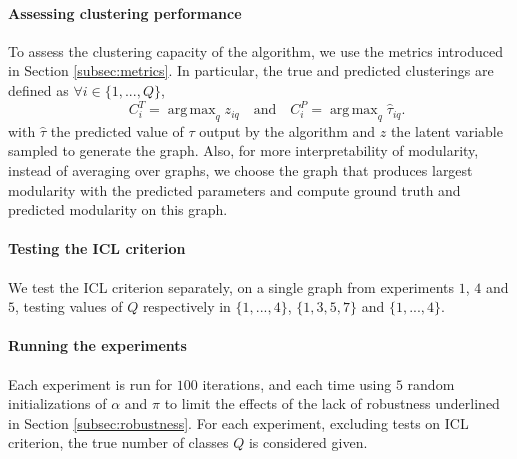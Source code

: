 \documentclass[switch, 12pt]{article}
\newcommand{\J}{\mathcal{J}}
\DeclareMathOperator*{\argmax}{arg\,max}
\newcommand{\intset}[2]{\{#1, ..., #2\}}
\begin{document}
\begin{multicols}{2}

    \paragraph{Assessing clustering performance} To assess the clustering capacity of the algorithm, we use the metrics introduced in Section \ref{subsec:metrics}. In particular, the true and predicted clusterings are defined as $\forall i \in \intset{1}{Q}$,
    \begin{equation}
        \quad C^T_i = \argmax_q z_{iq} \quad \text{and} \quad C^P_i = \argmax_q \hat{\tau}_{iq}.
    \end{equation}
    with $\hat{\tau}$ the predicted value of $\tau$ output by the algorithm and $z$ the latent variable sampled to generate the graph. Also, for more interpretability of modularity, instead of averaging over graphs, we choose the graph that produces largest modularity with the predicted parameters and compute ground truth and predicted modularity on this graph.

    \paragraph{Testing the ICL criterion} We test the ICL criterion separately, on a single graph from experiments $1$, $4$ and $5$, testing values of $Q$ respectively in $\intset{1}{4}$, $\{1, 3, 5, 7\}$ and $\intset{1}{4}$.

    \paragraph{Running the experiments} Each experiment is run for $100$ iterations, and each time using $5$ random initializations of $\alpha$ and $\pi$ to limit the effects of the lack of robustness underlined in Section \ref{subsec:robustness}. For each experiment, excluding tests on ICL criterion, the true number of classes $Q$ is considered given.


\end{multicols}
\end{document}
